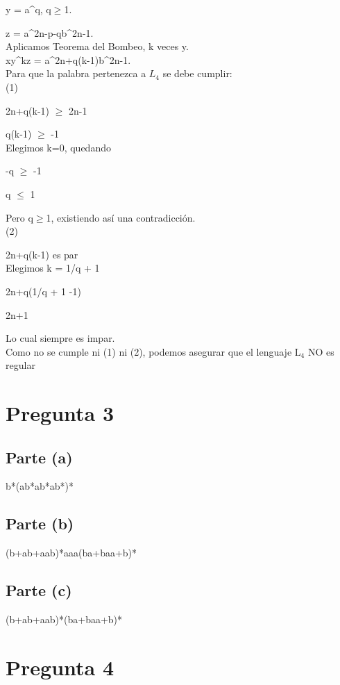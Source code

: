 \documentclass[11pt,letterpaper]{article}
\begin{document}
y = a^q, q$\geqslant$1.

z = a^{2n-p-q}b^{2n-1}.
 \\

Aplicamos Teorema del Bombeo, k veces y.
 \\
 
xy^kz = a^{2n+q(k-1)}b^{2n-1}.
 \\

Para que la palabra pertenezca a $L_{4}$ se debe cumplir:
 \\
 
(1)

2n+q(k-1) $\geqslant$ 2n-1

q(k-1) $\geqslant$ -1
 \\
 
Elegimos k=0, quedando

-q $\geqslant$ -1

q $\leqslant$ 1

Pero q$\geqslant$1, existiendo así una contradicción.
 \\
 
(2) 

2n+q(k-1) es par
 \\
 
Elegimos k = 1/q + 1

2n+q(1/q + 1 -1)

2n+1

Lo cual siempre es impar.
 \\

Como no se cumple ni (1) ni (2), podemos asegurar que el lenguaje L$_{4}$ NO es regular


\section{Pregunta 3}
\subsection{Parte (a)}
b*(ab*ab*ab*)*
\subsection{Parte (b)}
(b+ab+aab)*aaa(ba+baa+b)*
\subsection{Parte (c)}
(b+ab+aab)*(ba+baa+b)*

\section{Pregunta 4}
\end{document}
